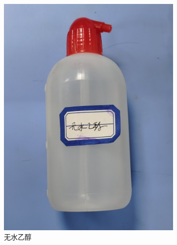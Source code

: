 \documentclass[a4paper]{report} %
\begin{document}
\begin{figure}[htbp]
\begin{subfigure}{0.22\textwidth}
        \includegraphics[width=\linewidth]{无水乙醇.jpg}
        \caption{无水乙醇}
    \end{subfigure}
    \begin{subfigure}{0.22\textwidth}

\end{subfigure}
\end{figure}
\end{document}
